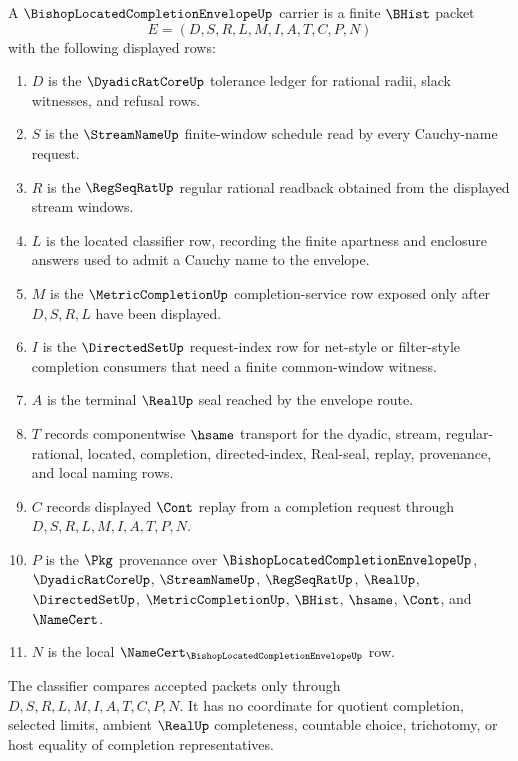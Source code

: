 \begin{definition}
\label{def:bishop-located-completion-envelope-carrier}
A $\BishopLocatedCompletionEnvelopeUp$ carrier is a finite $\BHist$ packet
$$
E=(D,S,R,L,M,I,A,T,C,P,N)
$$
with the following displayed rows:
\begin{enumerate}
\item $D$ is the $\DyadicRatCoreUp$ tolerance ledger for rational radii, slack witnesses, and refusal rows.
\item $S$ is the $\StreamNameUp$ finite-window schedule read by every Cauchy-name request.
\item $R$ is the $\RegSeqRatUp$ regular rational readback obtained from the displayed stream windows.
\item $L$ is the located classifier row, recording the finite apartness and enclosure answers used to admit a Cauchy name to the envelope.
\item $M$ is the $\MetricCompletionUp$ completion-service row exposed only after $D,S,R,L$ have been displayed.
\item $I$ is the $\DirectedSetUp$ request-index row for net-style or filter-style completion consumers that need a finite common-window witness.
\item $A$ is the terminal $\RealUp$ seal reached by the envelope route.
\item $T$ records componentwise $\hsame$ transport for the dyadic, stream, regular-rational, located, completion, directed-index, Real-seal, replay, provenance, and local naming rows.
\item $C$ records displayed $\Cont$ replay from a completion request through $D,S,R,L,M,I,A,T,P,N$.
\item $P$ is the $\Pkg$ provenance over $\BishopLocatedCompletionEnvelopeUp$, $\DyadicRatCoreUp$, $\StreamNameUp$, $\RegSeqRatUp$, $\RealUp$, $\DirectedSetUp$, $\MetricCompletionUp$, $\BHist$, $\hsame$, $\Cont$, and $\NameCert$.
\item $N$ is the local $\NameCert_{\BishopLocatedCompletionEnvelopeUp}$ row.
\end{enumerate}
The classifier compares accepted packets only through $D,S,R,L,M,I,A,T,C,P,N$. It has no coordinate for quotient completion, selected limits, ambient $\RealUp$ completeness, countable choice, trichotomy, or host equality of completion representatives.
\end{definition}

